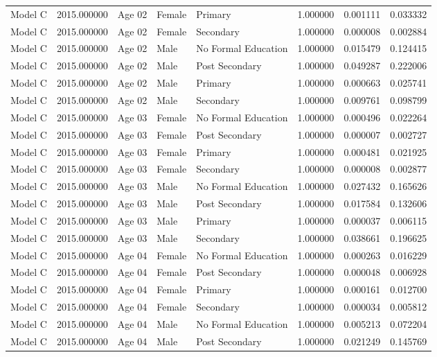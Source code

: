 \begin{table}[ht]
\begin{tabular}{lrlllrrr}
Model C & 2015.000000 & Age 02 & Female & Primary & 1.000000 & 0.001111 & 0.033332 \\
Model C & 2015.000000 & Age 02 & Female & Secondary & 1.000000 & 0.000008 & 0.002884 \\
Model C & 2015.000000 & Age 02 & Male & No Formal Education & 1.000000 & 0.015479 & 0.124415 \\
Model C & 2015.000000 & Age 02 & Male & Post Secondary & 1.000000 & 0.049287 & 0.222006 \\
Model C & 2015.000000 & Age 02 & Male & Primary & 1.000000 & 0.000663 & 0.025741 \\
Model C & 2015.000000 & Age 02 & Male & Secondary & 1.000000 & 0.009761 & 0.098799 \\
Model C & 2015.000000 & Age 03 & Female & No Formal Education & 1.000000 & 0.000496 & 0.022264 \\
Model C & 2015.000000 & Age 03 & Female & Post Secondary & 1.000000 & 0.000007 & 0.002727 \\
Model C & 2015.000000 & Age 03 & Female & Primary & 1.000000 & 0.000481 & 0.021925 \\
Model C & 2015.000000 & Age 03 & Female & Secondary & 1.000000 & 0.000008 & 0.002877 \\
Model C & 2015.000000 & Age 03 & Male & No Formal Education & 1.000000 & 0.027432 & 0.165626 \\
Model C & 2015.000000 & Age 03 & Male & Post Secondary & 1.000000 & 0.017584 & 0.132606 \\
Model C & 2015.000000 & Age 03 & Male & Primary & 1.000000 & 0.000037 & 0.006115 \\
Model C & 2015.000000 & Age 03 & Male & Secondary & 1.000000 & 0.038661 & 0.196625 \\
Model C & 2015.000000 & Age 04 & Female & No Formal Education & 1.000000 & 0.000263 & 0.016229 \\
Model C & 2015.000000 & Age 04 & Female & Post Secondary & 1.000000 & 0.000048 & 0.006928 \\
Model C & 2015.000000 & Age 04 & Female & Primary & 1.000000 & 0.000161 & 0.012700 \\
Model C & 2015.000000 & Age 04 & Female & Secondary & 1.000000 & 0.000034 & 0.005812 \\
Model C & 2015.000000 & Age 04 & Male & No Formal Education & 1.000000 & 0.005213 & 0.072204 \\
Model C & 2015.000000 & Age 04 & Male & Post Secondary & 1.000000 & 0.021249 & 0.145769 \\

\end{tabular}
\end{table}
